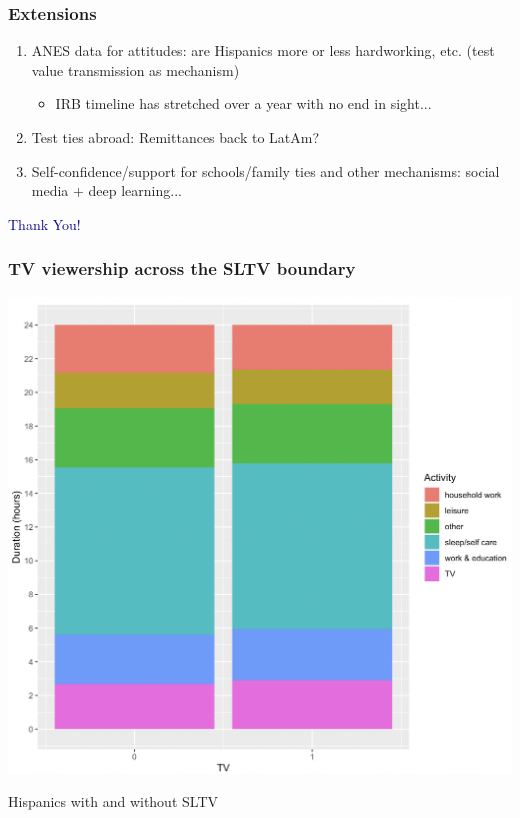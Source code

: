 \documentclass{beamer}
\begin{document}
\begin{frame}
\frametitle{Extensions}
\begin{enumerate}
\item ANES data for attitudes: are Hispanics more or less hardworking, etc. (test value transmission as mechanism)
\begin{itemize}
\item IRB timeline has stretched over a year with no end in sight...
\end{itemize}

\item Test ties abroad: Remittances back to LatAm?
\item Self-confidence/support for schools/family ties and other mechanisms: social media + deep learning...

\end{enumerate}

\end{frame}

		
\begin{frame}
\Large \centering \textcolor{darkblue}{Thank You!}
\end{frame}






\begin{frame}
\frametitle{TV viewership across the SLTV boundary} \label{atus_breakdown}

\begin{center}
\includegraphics[width=.75\textwidth]{../../analysis/Output/graphs/time_breakdown.png}\\
\end{center}
\vspace{-5pt}
\footnotesize Hispanics with and without SLTV \hyperlink{atus_time}{}

\end{frame}
\end{document}
